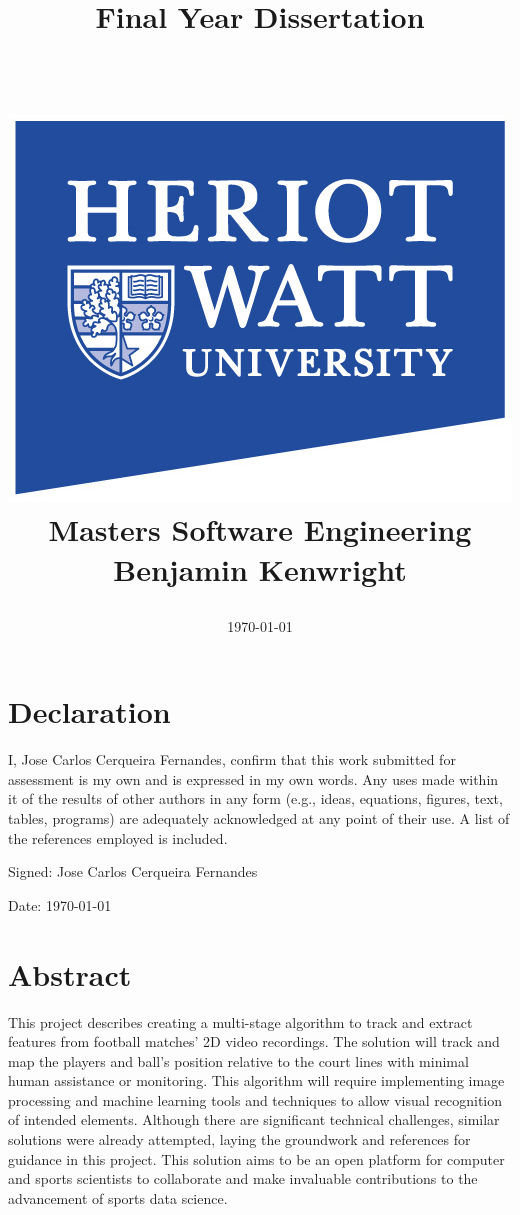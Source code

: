 \documentclass[
    11pt,
    oneside
]{report}
\title{
{\ThesisTitle}\\
\hfill \\
{\large Final Year Dissertation}\\
{\large \TheAuthor} \\
\hfill \\
{\includegraphics[scale=2.5]{hw.jpg}} \\
{\large Masters Software Engineering} \\
{\large Benjamin Kenwright} \\
\date{\today}
}
\newcommand{\TheAuthor}{Jose Carlos Cerqueira Fernandes}
\begin{document}
\maketitle



\chapter*{Declaration}
\thispagestyle{empty}

I, \TheAuthor, confirm that this work submitted for assessment is my own and is expressed in my own words. Any uses made within it of the results of other authors in any form (e.g., ideas, equations, figures, text, tables, programs) are adequately acknowledged at any point of their use. A list of the references employed is included.

\hfill


Signed: \TheAuthor


Date: \today

\chapter*{Abstract}
\thispagestyle{empty}

This project describes creating a multi-stage algorithm to track and extract features from football matches' 2D video recordings. The solution will track and map the players and ball's position relative to the court lines with minimal human assistance or monitoring. This algorithm will require implementing image processing and machine learning tools and techniques to allow visual recognition of intended elements. Although there are significant technical challenges, similar solutions were already attempted, laying the groundwork and references for guidance in this project. This solution aims to be an open platform for computer and sports scientists to collaborate and make invaluable contributions to the advancement of sports data science.



\setcounter{page}{0}
\end{document}
